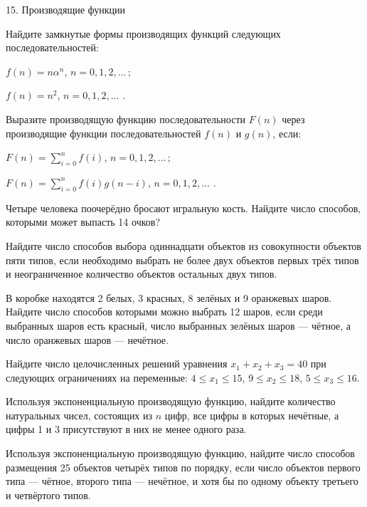 



\biLangHeader
{15.}
{Производящие функции}

\begin{problemList}

\problemItemWithCommonPart
{}
{Найдите замкнутые формы производящих функций следующих последовательностей:}
{\begin{belarusianEnumerate}
  \item $f(n) = n\alpha^n$, $n = 0, 1, 2, \ldots\, $;
  \item $f(n) = n^2$, $n = 0, 1, 2, \ldots\,\, $.
\end{belarusianEnumerate}}

\problemItemWithCommonPart
{}
{Выразите производящую функцию последовательности $F(n)$ через производящие
функции последовательностей $f(n)$ и $g(n)$, если:}
{\begin{belarusianEnumerate}
  \item $F(n) = \sum_{i = 0}^n f(i)$, $n = 0, 1, 2, \ldots\, $;
  \item $F(n) = \sum_{i = 0}^n f(i)g(n - i)$, $n = 0, 1, 2, \ldots\,\, $.
\end{belarusianEnumerate}}

\problemItemSimple
{}
{Четыре человека поочерёдно бросают игральную кость. Найдите число способов,
которыми может выпасть 14 очков?}

\problemItemSimple
{}
{Найдите число способов выбора одиннадцати объектов из совокупности объектов
пяти типов, если необходимо выбрать не более двух объектов первых трёх типов и
неограниченное количество объектов остальных двух типов.}

\problemItemSimple
{}
{В коробке находятся 2 белых, 3 красных, 8 зелёных и 9 оранжевых шаров.
Найдите число способов которыми можно выбрать 12 шаров, если среди выбранных шаров
есть красный, число выбранных зелёных шаров --- чётное, а число оранжевых шаров ---
нечётное.}

\problemItemSimple
{}
{Найдите число целочисленных решений уравнения $x_1 + x_2 + x_3 = 40$ при
следующих ограничениях на переменные: $4 \le x_1 \le 15$, $9 \le x_2 \le 18$,
$5 \le x_3 \le 16$.}

\problemItemSimple
{}
{Используя экспоненциальную производящую функцию, найдите количество
натуральных чисел, состоящих из $n$ цифр, все цифры в которых нечётные, а цифры 1 и 3
присутствуют в них не менее одного раза.}

\problemItemSimple
{}
{Используя экспоненциальную производящую функцию, найдите число способов
размещения 25 объектов четырёх типов по порядку, если число объектов первого
типа --- чётное, второго типа --- нечётное, и хотя бы по одному объекту третьего и
четвёртого типов.}


\end{problemList}
